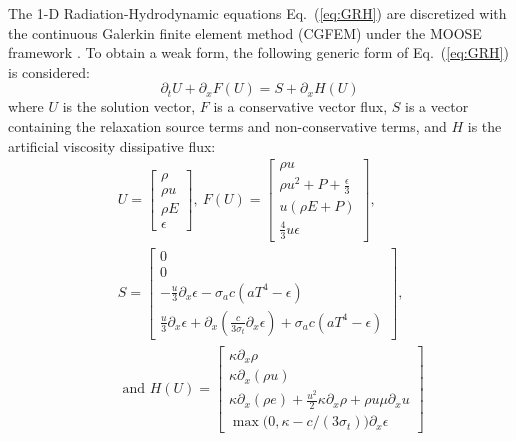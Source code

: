 \documentclass[review]{elsarticle}
\newcommand{\eqt}[1]{Eq.~(\ref{#1})}                     %
\begin{document}
The 1-D Radiation-Hydrodynamic equations \eqt{eq:GRH} are discretized with the continuous Galerkin finite element method (CGFEM) under the MOOSE framework \cite{Moose}. To obtain a weak form, the following generic form of \eqt{eq:GRH} is considered:
\begin{equation}
\label{eq:form}
\partial_t U + \partial_x F \left( U \right) = S + \partial_x H \left(U\right)
\end{equation}
where $U$ is the solution vector, $F$ is a conservative vector flux, $S$ is a vector containing the relaxation source terms and non-conservative terms, and $H$ is the artificial viscosity dissipative flux:
\begin{eqnarray*}
&&U = 
\begin{bmatrix}
\rho \\
\rho u \\
\rho E \\
\epsilon
\end{bmatrix}
,\
F(U) = 
\begin{bmatrix}
\rho u \\
\rho u^2 + P + \frac{\epsilon}{3} \\
u \left( \rho E + P \right) \\
\frac{4}{3} u \epsilon
\end{bmatrix}
,\ \\
&&S = 
\begin{bmatrix}
0 \\
0 \\
-\frac{u}{3} \partial_x \epsilon - \sigma_a c \left( a T^4 - \epsilon \right) \\
\frac{u}{3} \partial_x \epsilon + \partial_x \left( \frac{c}{3 \sigma_t} \partial_x \epsilon \right) + \sigma_a c \left( a T^4 - \epsilon \right)
\end{bmatrix}
,
\\
&&\text{ and } 
H(U) = 
\begin{bmatrix}
\kappa \partial_x \rho \\
\kappa \partial_x (\rho u) \\
\kappa \partial_x \left( \rho e \right) + \frac{u^2}{2} \kappa \partial_x \rho + \rho u \mu \partial_x u \\
\max \big( 0, \kappa- c/(3 \sigma_t) \big) \partial_x \epsilon 
\end{bmatrix}
\end{eqnarray*}
\end{document}
